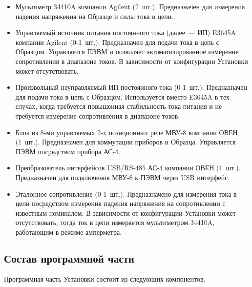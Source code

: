 \documentclass[12pt, a4paper, twocolumn]{book}
\begin{document}
\begin{itemize}

\item Мультиметр 34410A компании Agilent (2~шт.). Предназначен для измерения падения напряжения на Образце и силы тока в цепи.

\item Управляемый источник питания постоянного тока (далее~--- ИП) E3645A компании Agilent (0-1~шт.). Предназначен для подачи тока в цепь с Образцом. Управляется ПЭВМ и позволяет автоматизированное измерение сопротивления в диапазоне токов. В зависимости от конфигурации Установки может отсутствовать.

\item Произвольный неуправляемый ИП постоянного тока (0-1~шт.). Предназначен для подачи тока в цепь с Образцом. Используется вместо E3645A в тех случах, когда требуется повышенная стабильность тока питания и не требуется измерение сопротивления в диапазоне токов.

\item Блок из 8-ми управляемых 2-х позиционных реле МВУ-8 компании ОВЕН (1~шт.). Предназначен для коммутации приборов и Образца. Управляется ПЭВМ посредством прибора АС-4.

\item Преобразователь интерфейсов USB/RS-485 АС-4 компании ОВЕН (1~шт.). Предназначен для подключения МВУ-8 к ПЭВМ через USB интерфейс.

\item Эталонное сопротивление (0-1~шт.). Предназначено для измерения тока в цепи посредством измерения падения напряжения на сопротивлении с известным номиналом. В зависимости от конфигурации Установки может отсутствовать, тогда ток в цепи измеряется мультиметром 34410A, работающим в режиме амперметра.

\end{itemize}

\subsection{Состав программной части}
\label{sec_software}

Программная часть Установки состоит из следующих компонентов.
\end{document}
